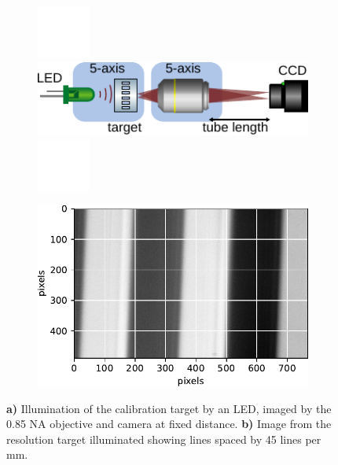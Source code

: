 \begin{figure}
	\begin{subfigure}{.45\textwidth}
	    \flushleft
	    \includegraphics[height=1.75cm]{figures/white.jpeg}
	    \includegraphics[width=\linewidth]{figures/LEDcalibration.pdf}
	    \includegraphics[height=1.75cm]{figures/white.jpeg}
		\caption{}
		\label{fig:SetupResolutionTarget}
	\end{subfigure}
	\hfill
	\begin{subfigure}{.52\textwidth}
	    \flushright
		\includegraphics[width=\linewidth]{figures/LineSpacingCalibration.pdf}
		\caption{}
		\label{fig:LineSpacing}
	\end{subfigure}
	\caption{\textsf{\textbf{a)}} Illumination of the calibration target by an LED, imaged by the 0.85 NA objective and camera at fixed distance.
	\textsf{\textbf{b)}} Image from the resolution target illuminated showing lines spaced by 45 lines per mm.}
	\label{fig:resolutionTarget}
\end{figure}


